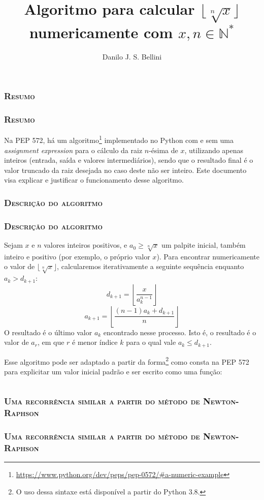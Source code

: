 \documentclass{article}
\title{Algoritmo para calcular $\lfloor \sqrt[n]{x} \rfloor$
       numericamente com $x, n \in \mathds{N}^*$}
\author{Danilo J. S. Bellini}
\let \sectionBkp = \section
\newcommand{\sectionFormatter}[1]{
    \centering\large\textbf{\textsc{#1}}}
\renewcommand{\section}[2]
    {\ifthenelse{\equal{#1}{*}}
        {\sectionBkp*{\sectionFormatter{#2}}}
        {\sectionBkp{\sectionFormatter{#2}}}
    }
\let \partBkp = \part
\newcommand{\partFormatter}[1]{
    \centering\Large\textbf{\textsc{#1}}}
\renewcommand{\part}[2]
    {\ifthenelse{\equal{#1}{*}}
        {\partBkp*{\partFormatter{#2}}}
        {\partBkp{\partFormatter{#2}}}
    }
\begin{document}
\makeatletter\part*{\@title}\hfill\@author\makeatother


\section*{Resumo}

Na PEP 572, há um algoritmo\footnote{
  \url{https://www.python.org/dev/peps/pep-0572/\#a-numeric-example}
} implementado no Python com e sem uma \emph{assignment expression}
para o cálculo da raiz $n$-ésima de $x$,
utilizando apenas inteiros (entrada, saída e valores intermediários),
sendo que o resultado final é o valor truncado da raiz desejada
no caso deste não ser inteiro.
Este documento visa explicar e justificar
o funcionamento desse algoritmo.


\section*{Descrição do algoritmo}

Sejam $x$ e $n$ valores inteiros positivos,
e $a_0 \ge \sqrt[n]{x}$ um palpite inicial, também inteiro e positivo
(por exemplo, o próprio valor $x$).
Para encontrar numericamente o valor de $\lfloor \sqrt[n]{x} \rfloor$,
calcularemos iterativamente a seguinte sequência
enquanto $a_k > d_{k+1}$:
\[d_{k+1} = \left\lfloor \dfrac{x}{a_k^{n-1}} \right\rfloor\]
\[a_{k+1} = \left\lfloor \dfrac{(n-1) a_k + d_{k+1}}{n} \right\rfloor\]
O resultado é o último valor $a_k$ encontrado nesse processo.
Isto é, o resultado é o valor de $a_r$,
em que $r$ é menor índice $k$ para o qual vale $a_k \le d_{k+1}$.

Esse algoritmo pode ser adaptado
a partir da forma\footnote{
  O uso dessa sintaxe está disponível a partir do Python 3.8.
} como consta na PEP 572
para explicitar um valor inicial padrão e ser escrito como uma função:

\begin{center}
  \begin{minipage}{7cm}
    \inputminted{python}{nth_root.py}
  \end{minipage}
\end{center}


\section*{Uma recorrência similar a partir do método de Newton-Raphson}
\end{document}
